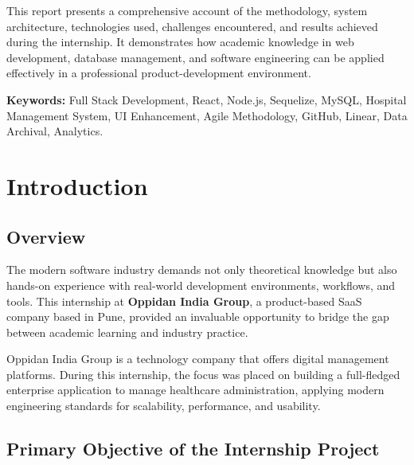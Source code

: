 \documentclass[12pt,a4paper]{article}
\begin{document}
This report presents a comprehensive account of the methodology, system architecture, technologies used, challenges encountered, and results achieved during the internship. It demonstrates how academic knowledge in web development, database management, and software engineering can be applied effectively in a professional product-development environment.

\vspace{0.3in}
\noindent\textbf{Keywords:} Full Stack Development, React, Node.js, Sequelize, MySQL, Hospital Management System, UI Enhancement, Agile Methodology, GitHub, Linear, Data Archival, Analytics.

\newpage
\tableofcontents

\newpage
\listoffigures

\listoftables

\newpage
\section{Introduction}
\label{chap:intro}

\subsection{Overview}

The modern software industry demands not only theoretical knowledge but also hands-on experience with real-world development environments, workflows, and tools. This internship at \textbf{Oppidan India Group}, a product-based SaaS company based in Pune, provided an invaluable opportunity to bridge the gap between academic learning and industry practice.

Oppidan India Group is a technology company that offers digital management platforms. During this internship, the focus was placed on building a full-fledged enterprise application to manage healthcare administration, applying modern engineering standards for scalability, performance, and usability.

\subsection{Primary Objective of the Internship Project}
\end{document}
